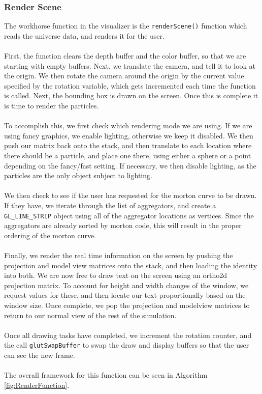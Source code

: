 \documentclass[fleqn,10pt]{UserGuideArx} %
\begin{document}
\subsubsection{Render Scene}
    The workhorse function in the visualizer is the \texttt{renderScene()} function which reads the universe data, and renders it for the user. \\~\\
    First, the function clears the depth buffer and the color buffer, so that we are starting with empty buffers. Next, we translate the camera, and tell it to look at the origin. We then rotate the camera around the origin by the current value specified by the rotation variable, which gets incremented each time the function is called. Next, the bounding box is drawn on the screen. Once this is complete it is time to render the particles. \\~\\
    To accomplish this, we first check which rendering mode we are using. If we are using fancy graphics, we enable lighting, otherwise we keep it disabled. We then push our matrix back onto the stack, and then translate to each location where there should be a particle, and place one there, using either a sphere or a point depending on the fancy/fast setting. If necessary, we then disable lighting, as the particles are the only object subject to lighting.\\~\\
    We then check to see if the user has requested for the morton curve to be drawn. If they have, we iterate through the list of aggregators, and create a \texttt{GL\_LINE\_STRIP} object using all of the aggregator locations as vertices. Since the aggregators are already sorted by morton code, this will result in the proper ordering of the morton curve.\\~\\
    Finally, we render the real time information on the screen by pushing the projection and model view matrices onto the stack, and then loading the identity into both. We are now free to draw text on the screen using an ortho2d projection matrix. To account for height and width changes of the window, we request values for these, and then locate our text proportionally based on the window size. Once complete, we pop the projection and modelview matrices to return to our normal view of the rest of the simulation.\\~\\
    Once all drawing tasks have completed, we increment the rotation counter, and the call \texttt{glutSwapBuffer} to swap the draw and display buffers so that the user can see the new frame.\\~\\
    The overall framework for this function can be seen in Algorithm \ref{fig:RenderFunction}.
\end{document}
